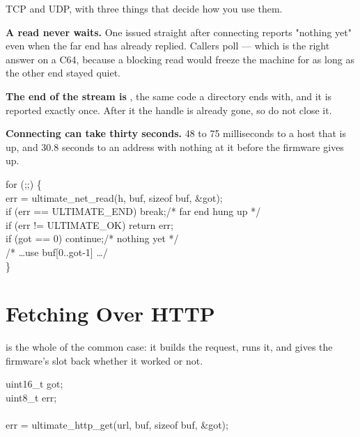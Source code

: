TCP and UDP, with three things that decide how you use them.

\textbf{A read never waits.} One issued straight after connecting reports
"nothing yet" even when the far end has already replied. Callers poll --- which
is the right answer on a C64, because a blocking read would freeze the machine
for as long as the other end stayed quiet.

\textbf{The end of the stream is }, the same code a
directory ends with, and it is reported exactly once. After it the handle is
already gone, so do not close it.

\textbf{Connecting can take thirty seconds.} 48 to 75 milliseconds to a host
that is up, and 30.8 seconds to an address with nothing at it before the
firmware gives up.

\begin{listingbox}
for (;;) \{\\
\hspace*{1em}err = ultimate\_net\_read(h, buf, sizeof buf, \&got);\\
\hspace*{1em}if (err == ULTIMATE\_END) break;\hspace{1em}/* far end hung up */\\
\hspace*{1em}if (err != ULTIMATE\_OK)   return err;\\
\hspace*{1em}if (got == 0)             continue;\hspace{1em}/* nothing yet */\\
\hspace*{1em}/* \ldots use buf[0..got-1] \ldots */\\
\}
\end{listingbox}

\section{Fetching Over HTTP}

 is the whole of the common case: it builds the
request, runs it, and gives the firmware's slot back whether it worked or not.

\begin{listingbox}
uint16\_t got;\\
uint8\_t  err;\\
\\
err = ultimate\_http\_get(url, buf, sizeof buf, \&got);
\end{listingbox}

